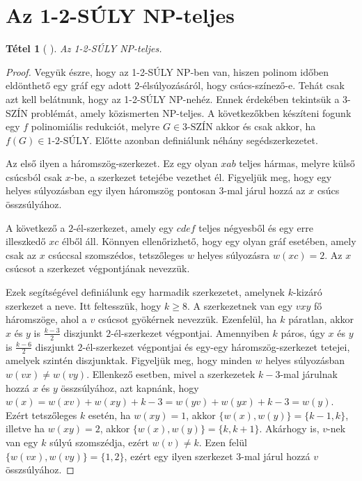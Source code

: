 \documentclass[12pt, a4paper]{report}
\newtheorem{tét}{Tétel}[section]
\theoremstyle{remark}
\theoremstyle{definition}
\begin{document}
\section{Az 1-2-SÚLY NP-teljes}
\begin{tét}[\citeauthor{Dudek2011} \cite{Dudek2011}]
Az 1-2-SÚLY NP-teljes.
\end{tét}

\begin{proof}
Vegyük észre, hogy az 1-2-SÚLY NP-ben van, hiszen polinom időben eldönthető egy gráf egy adott $2$-élsúlyozásáról, hogy csúcs-színező-e. Tehát csak azt kell belátnunk, hogy az 1-2-SÚLY NP-nehéz. Ennek érdekében tekintsük a 3-SZÍN problémát, amely közismerten NP-teljes. A következőkben készíteni fogunk egy $f$ polinomiális redukciót, melyre $G \in \textrm{3-SZÍN}$ akkor és csak akkor, ha $f(G) \in \textrm{1-2-SÚLY}$. Előtte azonban definiálunk néhány segédszerkezetet.

Az első ilyen a háromszög-szerkezet. Ez egy olyan $xab$ teljes hármas, melyre külső csúcsból csak $x$-be, a szerkezet tetejébe vezethet él. Figyeljük meg, hogy egy helyes súlyozásban egy ilyen háromszög pontosan $3$-mal járul hozzá az $x$ csúcs összsúlyához. 

A következő a $2$-él-szerkezet, amely egy $cdef$ teljes négyesből és egy erre illeszkedő $xc$ élből áll. Könnyen ellenőrizhető, hogy egy olyan gráf esetében, amely csak az $x$ csúccsal szomszédos, tetszőleges $w$ helyes súlyozásra $w(xc) = 2$. Az $x$ csúcsot a szerkezet végpontjának nevezzük.

Ezek segítségével definiálunk egy harmadik szerkezetet, amelynek $k$-kizáró szerkezet a neve. Itt feltesszük, hogy $k \geq 8$. A szerkezetnek van egy $vxy$ fő háromszöge, ahol a $v$ csúcsot gyökérnek nevezzük. Ezenfelül, ha $k$ páratlan, akkor $x$ és $y$ is $\frac{k - 3}{2}$ diszjunkt $2$-él-szerkezet végpontjai. Amennyiben $k$ páros, úgy $x$ és $y$ is $\frac{k - 6}{2}$ diszjunkt $2$-él-szerkezet végpontjai és egy-egy háromszög-szerkezet tetejei, amelyek szintén diszjunktak. Figyeljük meg, hogy minden $w$ helyes súlyozásban $w(vx) \neq w(vy)$. Ellenkező esetben, mivel a szerkezetek $k - 3$-mal járulnak hozzá $x$ és $y$ összsúlyához, azt kapnánk, hogy $w(x) = w(xv) + w(xy) + k - 3 = w(yv) + w(yx) + k - 3 = w(y)$. Ezért tetszőleges $k$ esetén, ha $w(xy) = 1$, akkor $\lbrace w(x), w(y) \rbrace = \lbrace k - 1, k \rbrace$, illetve ha $w(xy) = 2$, akkor $\lbrace w(x), w(y) \rbrace = \lbrace k, k + 1 \rbrace$. Akárhogy is, $v$-nek van egy $k$ súlyú szomszédja, ezért $w(v) \neq k$. Ezen felül $\lbrace w(vx), w(vy) \rbrace = \lbrace 1, 2 \rbrace$, ezért egy ilyen szerkezet $3$-mal járul hozzá $v$ összsúlyához.
 

\end{proof}
\end{document}
